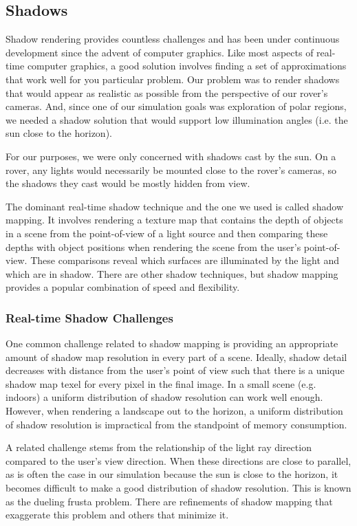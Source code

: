 \documentclass[twocolumn,letterpaper]{IEEEAerospaceCLS}  %
\begin{document}
\subsection{Shadows}
Shadow rendering provides countless challenges and has been under continuous development since the advent of computer graphics. 
Like most aspects of real-time computer graphics, a good solution involves finding a set of approximations that work well for you particular problem. 
Our problem was to render shadows that would appear as realistic as possible from the perspective of our rover's cameras. 
And, since one of our simulation goals was exploration of polar regions, we needed a shadow solution that would support low illumination angles (i.e. the sun close to the horizon).

For our purposes, we were only concerned with shadows cast by the sun. 
On a rover, any lights would necessarily be mounted close to the rover's cameras, so the shadows they cast would be mostly hidden from view.

The dominant real-time shadow technique and the one we used is called shadow mapping. 
It involves rendering a texture map that contains the depth of objects in a scene from the point-of-view of a light source and then comparing these depths with object positions when rendering the scene from the user's point-of-view. 
These comparisons reveal which surfaces are illuminated by the light and which are in shadow. 
There are other shadow techniques, but shadow mapping provides a popular combination of speed and flexibility.

\subsubsection{Real-time Shadow Challenges}
One common challenge related to shadow mapping is providing an appropriate amount of shadow map resolution in every part of a scene. 
Ideally, shadow detail decreases with distance from the user's point of view such that there is a unique shadow map texel for every pixel in the final image. 
In a small scene (e.g. indoors) a uniform distribution of shadow resolution can work well enough. 
However, when rendering a landscape out to the horizon, a uniform distribution of shadow resolution is impractical from the standpoint of memory consumption.

A related challenge stems from the relationship of the light ray direction compared to the user's view direction. 
When these directions are close to parallel, as is often the case in our simulation because the sun is close to the horizon, it becomes difficult to make a good distribution of shadow resolution. 
This is known as the dueling frusta problem. There are refinements of shadow mapping that exaggerate this problem and others that minimize it.
\end{document}
